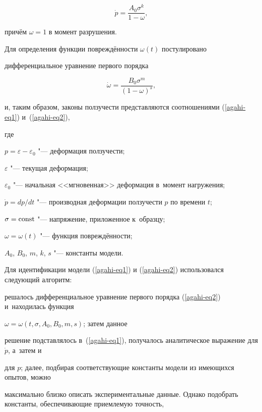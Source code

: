 \begin{equation}

\label{agahi-eq1}

\dot {p}=\frac{A_0 \sigma ^k}{1-\omega },

\end{equation}

причём $\omega =1$ в момент разрушения.

Для определения функции повреждённости $\omega (t)$ постулировано

дифференциальное уравнение первого порядка

\begin{equation}

\label{agahi-eq2}

\dot {\omega }=\frac{B_0 \sigma ^m}{(1-\omega )^s},

\end{equation}

и, таким образом, законы ползучести представляются соотношениями (\ref{agahi-eq1}) и~(\ref{agahi-eq2}),

где

$p=\varepsilon -\varepsilon _0 $ "--- деформация ползучести;

$\varepsilon $ "--- текущая деформация;

$\varepsilon _0 $ "--- начальная <<мгновенная>> деформация в~момент нагружения;

$\dot {p}={dp}/{dt}$ "--- производная деформации ползучести $p$ по времени $t$;

$\sigma =\rm const$ "--- напряжение, приложенное к~образцу;

$\omega =\omega (t) $ "--- функция повреждённости;

$A_0$, $B_0$, $m$, $k$, $s$ "--- константы модели.



Для идентификации модели (\ref{agahi-eq1}) и (\ref{agahi-eq2}) использовался следующий алгоритм:

решалось дифференциальное уравнение первого порядка (\ref{agahi-eq2}) и~находилась функция

$\omega =\omega (t, \sigma , A_0 , B_{0}, m, s)$; затем данное

решение подставлялось в~(\ref{agahi-eq1}), получалось аналитическое выражение для $\dot {p}$, а~затем и

для $p$; далее, подбирая соответствующие константы модели из имеющихся опытов, можно

максимально близко описать экспериментальные данные. Однако подобрать константы, обеспечивающие приемлемую точность,


